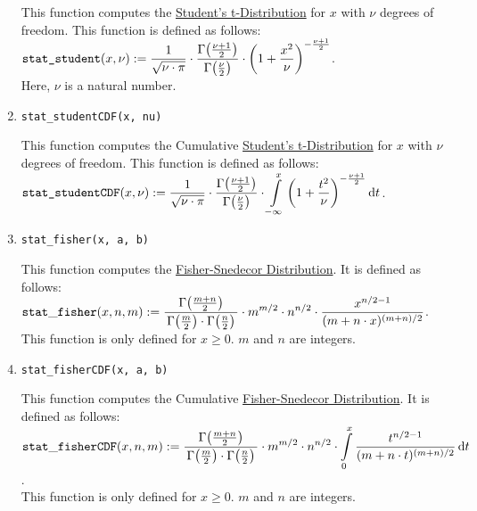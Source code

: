 \begin{enumerate}
			This function computes the 
			\href{https://en.wikipedia.org/wiki/Student%27s_t-distribution}{Student's t-Distribution}
			for $x$ with $\nu$ degrees of freedom.   This function is defined as follows:
			\\[0.2cm]
			\hspace*{1.3cm}
			$\displaystyle \texttt{stat\_student}(x, \nu) := \frac{1}{\sqrt{\nu\cdot\pi}} \cdot
			\frac{\Gamma\bigl(\frac{\nu+1}{2}\bigr)}{\Gamma\bigl(\frac{\nu}{2}\bigr)} \cdot
			\left(1 + \frac{x^2}{\nu}\right)^{-\frac{\nu+1}{2}}
			$.
			\\[0.2cm]
			Here, $\nu$ is a natural number.
		\item \texttt{stat\_studentCDF(x, nu)}

			This function computes the Cumulative 
			\href{https://en.wikipedia.org/wiki/Student%27s_t-distribution}{Student's t-Distribution}
			for $x$ with $\nu$ degrees of freedom.   This function is defined as follows:
			\\[0.2cm]
			\hspace*{1.3cm}
			$\displaystyle \texttt{stat\_studentCDF}(x, \nu) := \frac{1}{\sqrt{\nu\cdot\pi}} \cdot
			\frac{\Gamma\bigl(\frac{\nu+1}{2}\bigr)}{\Gamma\bigl(\frac{\nu}{2}\bigr)} \cdot
			\int\limits_{-\infty}^{x} \left(1 + \frac{t^2}{\nu}\right)^{-\frac{\nu+1}{2}} \mathrm{d} t
			$.
		\item \texttt{stat\_fisher(x, a, b)}

			This function computes the 
			\href{https://en.wikipedia.org/wiki/F-distribution}{Fisher-Snedecor Distribution}.
			It is defined as follows:
			\\[0.2cm]
			\hspace*{1.3cm}
			$\displaystyle \mathtt{stat\_fisher}(x, n, m) :=
			\frac{\Gamma\bigl(\frac{m+n}{2}\bigr)}{\,\Gamma\bigl(\frac{m}{2}\bigr) \cdot \Gamma\bigl(\frac{n}{2}\bigr)\,} 
			 \cdot m^{m/2} \cdot n^{n/2} \cdot \frac{x^{n/2-1}}{(m + n \cdot x)^{(m+n)/2}}
			$.
			\\[0.2cm]
			This function is only defined for $x \geq 0$.  $m$ and $n$ are integers.
		\item \texttt{stat\_fisherCDF(x, a, b)}

			This function computes the Cumulative
			\href{https://en.wikipedia.org/wiki/F-distribution}{Fisher-Snedecor Distribution}.
			It is defined as follows:
			\\[0.2cm]
			\hspace*{1.3cm}
			$\displaystyle \mathtt{stat\_fisherCDF}(x, n, m) :=
			\frac{\Gamma\bigl(\frac{m+n}{2}\bigr)}{\,\Gamma\bigl(\frac{m}{2}\bigr) \cdot \Gamma\bigl(\frac{n}{2}\bigr)\,} 
			 \cdot m^{m/2} \cdot n^{n/2} \cdot \int\limits_{0}^x \frac{t^{n/2-1}}{(m + n \cdot t)^{(m+n)/2}} \,\mathrm{d}t
			$.
			\\[0.2cm]
			This function is only defined for $x \geq 0$. $m$ and $n$ are integers.
		\end{enumerate}


